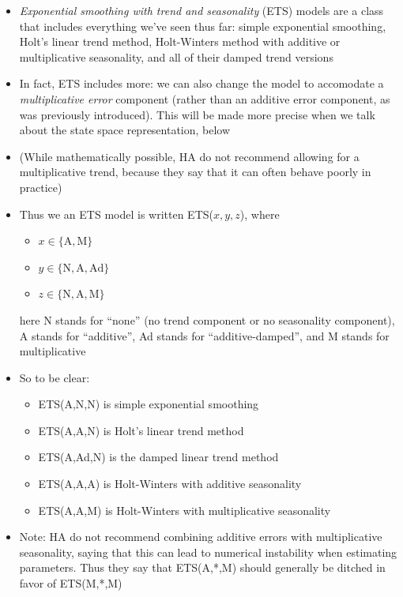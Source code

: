 \documentclass{article}
\begin{document}
\begin{itemize}
\item \emph{Exponential smoothing with trend and seasonality} (ETS) models are a
  class that includes everything we've seen thus far: simple exponential
  smoothing, Holt's linear trend method, Holt-Winters method with additive or
  multiplicative seasonality, and all of their damped trend versions  

\item In fact, ETS includes more: we can also change the model to accomodate a  
  \emph{multiplicative error} component (rather than an additive error
  component, as was previously introduced). This will be made more precise when
  we talk about the state space representation, below 

\item (While mathematically possible, HA do not recommend allowing for a
  multiplicative trend, because they say that it can often behave poorly in
  practice)  

\item Thus we an ETS model is written ETS($x,y,z$), where 
  \begin{itemize}
  \item $x \in \{ \text{A}, \text{M} \}$
  \item $y \in \{ \text{N}, \text{A}, \text{Ad} \}$
  \item $z \in \{ \text{N}, \text{A}, \text{M} \}$
  \end{itemize}
  here N stands for ``none'' (no trend component or no seasonality component), A
  stands for ``additive'', Ad stands for ``additive-damped'', and M stands for
  multiplicative

\item So to be clear:
  \begin{itemize}
  \item ETS(A,N,N) is simple exponential smoothing
  \item ETS(A,A,N) is Holt's linear trend method
  \item ETS(A,Ad,N) is the damped linear trend method
  \item ETS(A,A,A) is Holt-Winters with additive seasonality
  \item ETS(A,A,M) is Holt-Winters with multiplicative seasonality
  \end{itemize}

\item Note: HA do not recommend combining additive errors with multiplicative
  seasonality, saying that this can lead to numerical instability when
  estimating parameters. Thus they say that ETS(A,*,M) should generally be
  ditched in favor of ETS(M,*,M)   
\end{itemize}
\end{document}
